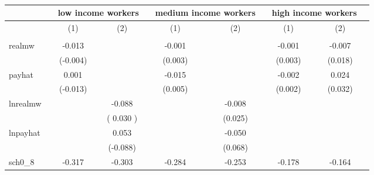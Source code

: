 \documentclass{article}
\begin{document}
\begin{landscape} 
\begin{table}[ht]
\centering
\caption{}
\label{my-label}
\begin{tabular}{llclclclclclcl}
                       \hline
                       &  & \multicolumn{3}{c}{low income workers} &  & \multicolumn{3}{c}{medium income workers} &  & \multicolumn{3}{c}{high income workers} &  \\
                       \hline
                       &  & (1)    &     & (2)   &  & (1)     &      & (2)    &  & (1)    &     & (2)    &  \\
                       \hline
                       &  &                 &     &                &  &                  &      &                 &  &                 &     &                 &  \\
realmw                 &  & -0.013      &     &                &  & -0.001       &      &                 &  & -0.001      &     & -0.007      &  \\
                       &  & (-0.004)       &     &                &  & (0.003)         &      &                 &  & (0.003)       &     & (0.018)        &  \\
payhat                 &  & 0.001        &     &                &  & -0.015       &      &                 &  & -0.002     &     & 0.024        &  \\
                       &  & (-0.013)       &     &                &  &(0.005)        &      &                 &  & (0.002)       &     & (0.032)        &  \\
lnrealmw               &  &                 &     & -0.088        &  &                  &      & -0.008       &  &                 &     &                 &  \\
                       &  &                 &     & ( 0.030 )   &  &                  &      & (0.025)       &  &                 &     &                 &  \\
lnpayhat               &  &                 &     & 0.053       &  &                  &      & -0.050      &  &                 &     &                 &  \\
                       &  &                 &     & (-0.088)   &  &                  &      & (0.068)       &  &                 &     &                 &  \\
sch0\_8                &  & -0.317       &     & -0.303     &  & -0.284         &      & -0.253      &  & -0.178      &     & -0.164      &  \\

\end{tabular}
\end{table}
\end{landscape}
\end{document}
